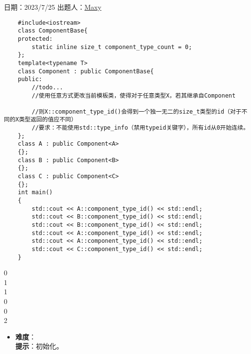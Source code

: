 日期：2023/7/25 出题人：\href{ https://b23.tv/FM0evat}{Maxy}\\

\begin{verbatim}
    #include<iostream>
    class ComponentBase{
    protected:
        static inline size_t component_type_count = 0;
    };
    template<typename T>
    class Component : public ComponentBase{
    public:
        //todo...
        //使用任意方式更改当前模板类，使得对于任意类型X，若其继承自Component
    
        //则X::component_type_id()会得到一个独一无二的size_t类型的id（对于不同的X类型返回的值应不同）
        //要求：不能使用std::type_info（禁用typeid关键字），所有id从0开始连续。
    };
    class A : public Component<A>
    {};
    class B : public Component<B>
    {};
    class C : public Component<C>
    {};
    int main()
    {
        std::cout << A::component_type_id() << std::endl;
        std::cout << B::component_type_id() << std::endl;
        std::cout << B::component_type_id() << std::endl;
        std::cout << A::component_type_id() << std::endl;
        std::cout << A::component_type_id() << std::endl;
        std::cout << C::component_type_id() << std::endl;
    }
\end{verbatim}

\begin{tcolorbox}[title = {要求运行结果},
        fonttitle = \bfseries, fontupper = \sffamily, fontlower = \itshape]
    0\\
    1\\
    1\\
    0\\
    0\\
    2
\end{tcolorbox}

\begin{itemize}
    \item \textbf{难度}：  \\
          \textbf{提示}：初始化。
\end{itemize}
